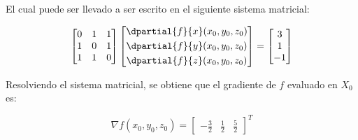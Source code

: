 El cual puede ser llevado a ser escrito en el siguiente sistema matricial:


\begin{equation*}
    \begin{bmatrix}
        0 & 1 & 1 \\
        1 & 0 & 1 \\
        1 & 1 & 0 \\
    \end{bmatrix}
    \begin{bmatrix}
        \dpartial{f}{x}(x_0,y_0,z_0) \\[3pt]
        \dpartial{f}{y}(x_0,y_0,z_0) \\[3pt]
        \dpartial{f}{z}(x_0,y_0,z_0) \\
    \end{bmatrix} =
    \begin{bmatrix}
        3 \\ 1 \\ -1
    \end{bmatrix}
\end{equation*}

Resolviendo el sistema matricial, se obtiene que el gradiente de $f$ evaluado en $X_0$ es:

\begin{equation*}
    \nabla f(x_0,y_0,z_0) =
    \begin{bmatrix}
        -\frac{3}{2} & \frac{1}{2} & \frac{5}{2}
    \end{bmatrix}^T
\end{equation*}
